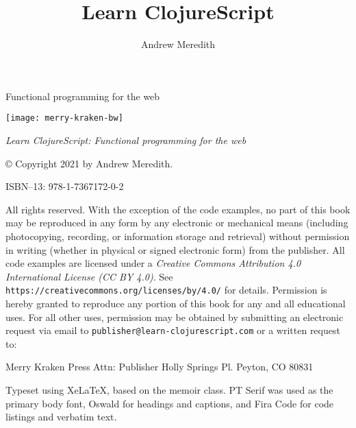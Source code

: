\documentclass[10pt,twoside,openright]{memoir}
\author{Andrew Meredith}
\title{Learn ClojureScript}
\date{}
\makeatletter
\newcommand{\subTitle}{Functional programming for the web}
\def\maketitle{%
  \null
  \thispagestyle{empty}%
  \begin{center}\leavevmode
    \begin{flushright}
    \normalfont
    {\Huge\textbf{\textsf{\@title}}\par}%
    \hrulefill\par
    {\LARGE\textsf{\subTitle}\par}%
    \vskip 4.5cm
    {\LARGE\textbf{\@author}\par}%
    \vskip 4.5cm
    \texttt{[image: merry-kraken-bw]}
    \end{flushright}
  \end{center}%
  \vfill
  \null
  \cleardoublepage
  }
\makeatother
\begin{document}
\maketitle

\frontmatter

\null\vfill

\begin{flushleft}
\textit{Learn ClojureScript: Functional programming for the web}


© Copyright 2021 by Andrew Meredith.


ISBN--13: 978-1-7367172-0-2

\bigskip
All rights reserved. With the exception of the code examples, no part of this book may be reproduced in any form by any electronic or mechanical means (including photocopying, recording, or information storage and retrieval) without permission in writing (whether in physical or signed electronic form) from the publisher. All code examples are licensed under a \emph{Creative Commons Attribution 4.0 International License (CC BY 4.0)}. See \texttt{https://creativecommons.org/licenses/by/4.0/} for details. Permission is hereby granted to reproduce any portion of this book for any and all educational uses. For all other uses, permission may be obtained by submitting an electronic request via email to \texttt{publisher@learn-clojurescript.com} or a written request to:

\bigskip
Merry Kraken Press\linebreak
Attn: Publisher Holly Springs Pl.\linebreak
Peyton, CO 80831\linebreak

\bigskip
Typeset using XeLaTeX, based on the memoir class. PT Serif was used as the primary body font, Oswald for headings and captions, and Fira Code for code listings and verbatim text.

\end{flushleft}

\clearpage
\end{document}
